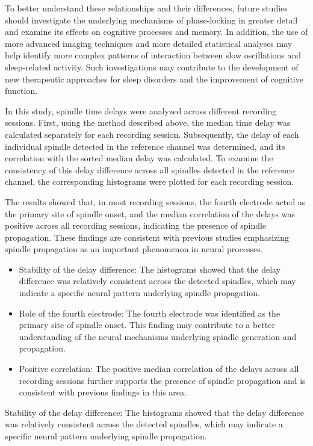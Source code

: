 \documentclass[12pt]{report}
\begin{document}
To better understand these relationships and their differences, future studies should investigate the underlying mechanisms of phase-locking in greater detail and examine its effects on cognitive processes and memory. In addition, the use of more advanced imaging techniques and more detailed statistical analyses may help identify more complex patterns of interaction between slow oscillations and sleep-related activity. Such investigations may contribute to the development of new therapeutic approaches for sleep disorders and the improvement of cognitive function.

In this study, spindle time delays were analyzed across different recording sessions. First, using the method described above, the median time delay was calculated separately for each recording session. Subsequently, the delay of each individual spindle detected in the reference channel was determined, and its correlation with the sorted median delay was calculated. To examine the consistency of this delay difference across all spindles detected in the reference channel, the corresponding histograms were plotted for each recording session.

The results showed that, in most recording sessions, the fourth electrode acted as the primary site of spindle onset, and the median correlation of the delays was positive across all recording sessions, indicating the presence of spindle propagation. These findings are consistent with previous studies emphasizing spindle propagation as an important phenomenon in neural processes.
\begin{itemize}
	\item Stability of the delay difference: The histograms showed that the delay difference was relatively consistent across the detected spindles, which may indicate a specific neural pattern underlying spindle propagation.
	
	\item Role of the fourth electrode: The fourth electrode was identified as the primary site of spindle onset. This finding may contribute to a better understanding of the neural mechanisms underlying spindle generation and propagation.
	
	\item Positive correlation: The positive median correlation of the delays across all recording sessions further supports the presence of spindle propagation and is consistent with previous findings in this area.
	
\end{itemize}
Stability of the delay difference: The histograms showed that the delay difference was relatively consistent across the detected spindles, which may indicate a specific neural pattern underlying spindle propagation.
\end{document}
